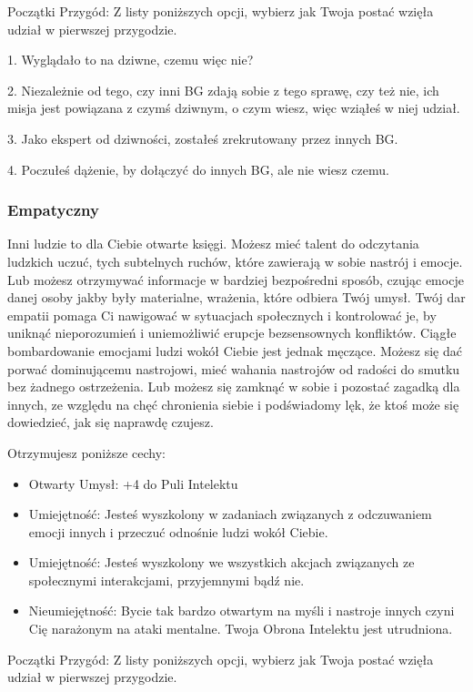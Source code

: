 Początki Przygód: Z listy poniższych opcji, wybierz jak Twoja postać wzięła udział w pierwszej przygodzie.

1. Wyglądało to na dziwne, czemu więc nie?

2. Niezależnie od tego, czy inni BG zdają sobie z tego sprawę, czy też nie, ich misja jest powiązana z czymś dziwnym, o czym wiesz, więc wziąłeś w niej udział.

3. Jako ekspert od dziwności, zostałeś zrekrutowany przez innych BG.

4. Poczułeś dążenie, by dołączyć do innych BG, ale nie wiesz czemu.

\subsubsection{Empatyczny}

Inni ludzie to dla Ciebie otwarte księgi. Możesz mieć talent do odczytania ludzkich uczuć, tych subtelnych ruchów, które zawierają w sobie nastrój i emocje. Lub możesz otrzymywać informacje w bardziej bezpośredni sposób, czując emocje danej osoby jakby były materialne, wrażenia, które odbiera Twój umysł. Twój dar empatii pomaga Ci nawigować w sytuacjach społecznych i kontrolować je, by uniknąć nieporozumień i uniemożliwić erupcje bezsensownych konfliktów. 
Ciągłe bombardowanie emocjami ludzi wokół Ciebie jest jednak męczące. Możesz się dać porwać dominującemu nastrojowi, mieć wahania nastrojów od radości do smutku bez żadnego ostrzeżenia. Lub możesz się zamknąć w sobie i pozostać zagadką dla innych, ze względu na chęć chronienia siebie i podświadomy lęk, że ktoś może się dowiedzieć, jak się naprawdę czujesz.

Otrzymujesz poniższe cechy:
\begin{itemize}
\item Otwarty Umysł: +4 do Puli Intelektu
\item Umiejętność: Jesteś wyszkolony w zadaniach związanych z odczuwaniem emocji innych i przeczuć odnośnie ludzi wokół Ciebie.
\item Umiejętność: Jesteś wyszkolony we wszystkich akcjach związanych ze społecznymi interakcjami, przyjemnymi bądź nie.
\item Nieumiejętność: Bycie tak bardzo otwartym na myśli i nastroje innych czyni Cię narażonym na ataki mentalne. Twoja Obrona Intelektu jest utrudniona.
\end{itemize}

Początki Przygód: Z listy poniższych opcji, wybierz jak Twoja postać wzięła udział w pierwszej przygodzie.

